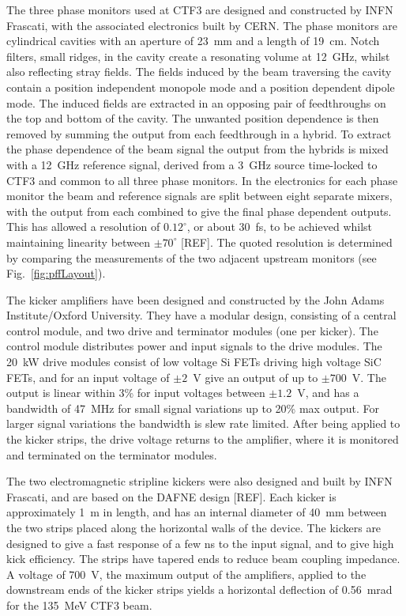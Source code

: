 \documentclass[%
 reprint,
superscriptaddress,
 amsmath,amssymb,
 prl,
]{revtex4-1}
\begin{document}

The three phase monitors used at CTF3 \cite{phMonEuCard} are designed and 
constructed by INFN Frascati, with the associated electronics built by CERN. 
The phase monitors are cylindrical cavities with an aperture of 23~mm and a 
length of 19~cm. 
Notch filters, small ridges, in the cavity create a resonating 
volume at 12~GHz, whilst also reflecting stray fields.
The fields induced by the beam traversing the cavity contain a position 
independent monopole mode and a position dependent dipole mode. The induced 
fields are extracted in an opposing pair of feedthroughs on the top and bottom 
of the cavity. The unwanted position dependence is then removed by summing the 
output from each feedthrough in a hybrid. 
To extract the phase dependence of the beam signal the output from the hybrids 
is mixed with a 12~GHz reference signal, derived from a 3~GHz source 
time-locked to CTF3 and common to all three phase monitors.
In the electronics for each phase monitor the beam and reference signals are 
split between eight separate mixers, with the output from each combined to give 
the final phase dependent outputs. This has allowed a resolution of 
\(0.12^\circ\), or about 30~fs, to be achieved whilst maintaining linearity 
between \(\pm70^\circ\) [REF]. The quoted resolution 
is determined by comparing the measurements of the two adjacent upstream 
monitors (see Fig.~\ref{fig:pffLayout}).

The kicker amplifiers \cite{RobertsThesis} have been designed and constructed 
by the John Adams Institute/Oxford University. They have a modular design, 
consisting of a central control module, and two drive and terminator modules 
(one per kicker). The control module distributes power and input signals to the 
drive modules. The 20~kW drive modules consist of low voltage Si FETs driving 
high voltage SiC FETs, and for an input voltage of \(\pm2\)~V give an output of 
up to \(\pm700\)~V. The output is linear within 3\% for input voltages between 
\(\pm1.2\)~V, and has a bandwidth of 47~MHz for small signal variations up to 
20\% max output. For larger signal variations the bandwidth is slew rate 
limited. After being applied to the kicker strips, the drive voltage returns to 
the amplifier, where it is monitored and terminated on the terminator modules.

The two electromagnetic stripline kickers \cite{kickerIPAC11} were also 
designed and built by INFN Frascati,  and are based on the DAFNE design [REF]. 
Each kicker is approximately 1~m in length, and has an internal diameter of 
40~mm between the two strips placed along the horizontal walls of the device.
The kickers are designed to give a fast response of a few ns to the input 
signal, and to give high kick efficiency. The strips have tapered ends 
to reduce beam coupling impedance.
A voltage of 700~V, the maximum output of the amplifiers, applied to the 
downstream ends of the kicker strips yields a horizontal deflection of 
0.56~mrad for the 135~MeV CTF3 beam.
\end{document}
